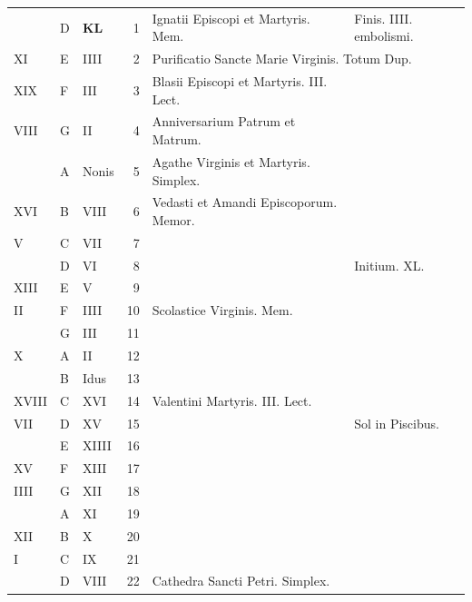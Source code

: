 \documentclass[11pt,openany]{book}
\begin{document}
\begin{center}
\begin{tabular}{l | l | l | r | l l}
 & D & \textbf{\color{Red} K\color{Blue}L} & 1 & \color{Red} Ignatii Episcopi et Martyris. Mem. & Finis. IIII. embolismi. \\
\color{Red} XI & E & \color{Red} IIII & 2 & \multicolumn{2}{l}{Purificatio Sancte Marie Virginis. Totum Dup.} \\
\color{Red} XIX & F & \color{Red} III & 3 & \color{Red} Blasii Episcopi et Martyris. III. Lect. \\
\color{Red} VIII & G & \color{Red} II & 4 & Anniversarium Patrum et Matrum. \\
 & \color{Red} A & \color{Red} Nonis & 5 & \color{Red} Agathe Virginis et Martyris. Simplex. \\
\color{Red} XVI & B & \color{Red} VIII & 6 &  Vedasti et Amandi Episcoporum. Memor. \\
\color{Red} V & C & \color{Red} VII & 7 & \\
\color{Red}  & D & \color{Red} VI & 8 & & \color{Red} Initium. XL. \\
\color{Red} XIII & E & \color{Red} V & 9 & & \color{Red} \\
\color{Red} II & F & \color{Red} IIII & 10 & Scolastice Virginis. Mem. & \color{Red} \\
\color{Red}  & G & \color{Red} III & 11 & & \color{Red} \\
\color{Red} X & \color{Red} A & \color{Red} II & 12 & \\
\color{Red}  & B & \color{Red} Idus & 13 & & \color{Red} \\
\color{Red} XVIII & C & \color{Red} XVI & 14 & \color{Red} Valentini Martyris. III. Lect. \\
\color{Red} VII & D & \color{Red} XV & 15 & & \color{Red} Sol in Piscibus. \\
\color{Red}  & E & \color{Red} XIIII & 16 & & \color{Red} \\
\color{Red} XV & F & \color{Red} XIII & 17 & & \color{Red} \\
\color{Red} IIII & G & \color{Red} XII & 18 & & \color{Red} \\
\color{Red}  & \color{Red} A & \color{Red} XI & 19 & & \color{Red} \\
\color{Red} XII & B & \color{Red} X & 20 & & \color{Red} \\
\color{Red} I & C & \color{Red} IX & 21 & & \color{Red} \\
\color{Red}  & D & \color{Red} VIII & 22 & \color{Red} Cathedra Sancti Petri. Simplex. \\

\end{tabular}
\end{center}
\end{document}
